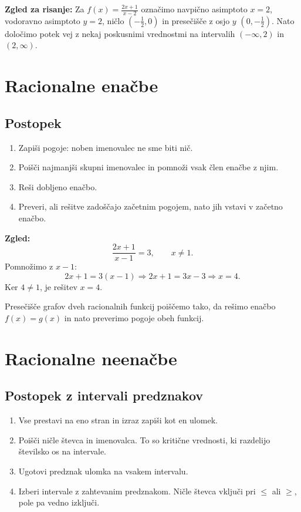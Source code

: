 \documentclass[11pt]{article}
\begin{document}
\textbf{Zgled za risanje:} Za $f(x)=\frac{2x+1}{x-2}$ označimo navpično asimptoto $x=2$, vodoravno asimptoto $y=2$, ničlo $\left(-\frac{1}{2},0\right)$ in presečišče z osjo $y$ $\left(0,-\frac{1}{2}\right)$. Nato določimo potek vej z nekaj poskusnimi vrednostmi na intervalih $(-\infty,2)$ in $(2,\infty)$.

\section{Racionalne enačbe}

\subsection{Postopek}

\begin{enumerate}[leftmargin=*]
  \item Zapiši pogoje: noben imenovalec ne sme biti nič.
  \item Poišči najmanjši skupni imenovalec in pomnoži vsak člen enačbe z njim.
  \item Reši dobljeno enačbo.
  \item Preveri, ali rešitve zadoščajo začetnim pogojem, nato jih vstavi v začetno enačbo.
\end{enumerate}

\textbf{Zgled:}
\[
 \frac{2x+1}{x-1}=3,\qquad x\ne 1.
\]
Pomnožimo z $x-1$:
\[
 2x+1=3(x-1)\Rightarrow 2x+1=3x-3\Rightarrow x=4.
\]
Ker $4\ne1$, je rešitev $x=4$.

Presečišče grafov dveh racionalnih funkcij poiščemo tako, da rešimo enačbo $f(x)=g(x)$ in nato preverimo pogoje obeh funkcij.

\section{Racionalne neenačbe}

\subsection{Postopek z intervali predznakov}

\begin{enumerate}[leftmargin=*]
  \item Vse prestavi na eno stran in izraz zapiši kot en ulomek.
  \item Poišči ničle števca in imenovalca. To so kritične vrednosti, ki razdelijo številsko os na intervale.
  \item Ugotovi predznak ulomka na vsakem intervalu.
  \item Izberi intervale z zahtevanim predznakom. Ničle števca vključi pri $\leq$ ali $\geq$, pole pa vedno izključi.
\end{enumerate}
\end{document}
